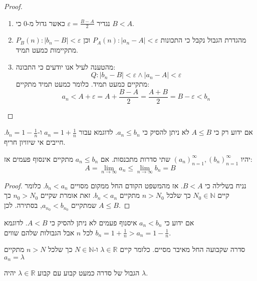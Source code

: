 \documentclass{tstextbook}
\begin{document}
\begin{proof}
  \begin{enumerate}
    \item נגדיר \(\varepsilon= \frac{B-A}{2}\) כאשר גדול מ-0 כי \(B<A\). 


    \item מהגדרת הגבול נקבל כי התכונות \(P_{A}(n):|a_{n}-A|<\varepsilon\) וכן \(P_{B}(n):|b_{n}-B|<\varepsilon\) מתקיימות כמעט תמיד. 


    \item מהטענה לעיל אנו יודעים כי התכונה: 
$$Q:|b_{n}-B|<\varepsilon \land|a_{n}-A|<\varepsilon$$
מתקיים כמעט תמיד. כלומר כמעט תמיד מתקיים:
$$a_{n}<A+\varepsilon=A+\frac{B-A}{2}=\frac{A+B}{2}=B-\varepsilon<b_{n}$$


  \end{enumerate}
\end{proof}
\begin{remark}
אם ידוע רק כי \(A\leq B\) לא ניתן להסיק כי \(a_{n}\leq b_{n}\). לדוגמא עבור \(a_{n}=1+\frac{1}{n}\) ו-\(b_{n}=1-\frac{1}{n}\). חייבים אי שיוויון חריף.

\end{remark}
\begin{theorem}
יהיו \((a_n)_{n=1}^\infty,(b_{n})_{n=1}^\infty\) שתי סדרות מתכנסות. אם \(a_{n}\leq b_{n}\) מתקיים אינסוף פעמים אז:
$$A=\lim_{ n \to \infty } a_{n}\leq \lim_{ n \to \infty } b_{n}=B$$

\end{theorem}
\begin{proof}
נניח בשלילה כי \(B<A\). אז מהמשפט הקודם החל ממקום מסויים \(b_{n}<a_{n}\). כלומר קיים \(N_{0} \in \mathbb{N}\) כך שלכל \(n>N_{0}\) מתקיים \(b_{n}<a_{n}\).  זאת אומרת שקיים  \(n_{0}>N_{0}\) כך שמתקיים \(a_{n_{0}}<b_{n_{0}}\), בסתירה. לכן \(A\leq B\).

\end{proof}
\begin{remark}
אם ידוע כי \(a_{n}<b_{n}\) איסנוף פעמים לא ניתן להסיק כי \(A<B\).  לדוגמא \(b_{n}=1+\frac{1}{n}>a_{n}=1-\frac{1}{n}\) לכל \(n\) אבל הגבולות שלהם שווים.

\end{remark}
\begin{definition}
סדרה שקבועה החל מאיבר מסיים. כלומר קיים \(\lambda \in \mathbb{R}\) ו-\(N \in \mathbb{N}\) כך שלכל \(n>N\) מתקיים \(a_{n}=\lambda\)

\end{definition}
\begin{proposition}
הגבול של סדרה כמעט קבוע עם קבוע \(\lambda \in \mathbb{R}\) יהיה \(\lambda\).

\end{proposition}
\end{document}
